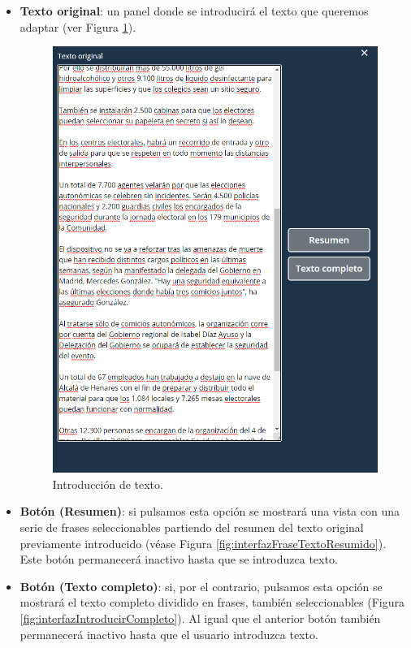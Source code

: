  \begin{itemize}
 	\item \textbf{Texto original}: un  panel donde se introducirá el texto que queremos adaptar (ver Figura \ref{fig:interfazIntroduccionTexto}).
 	\begin{figure}[h!]
 		\centering
 		
 		
 		\includegraphics[scale=0.6]{Imagenes/Figuras/PanelIzquierdo}
 		
 		
 		\caption{Introducción de texto.}
 		\label{fig:interfazIntroduccionTexto}
 	\end{figure}
 	 	\item \textbf{Botón (Resumen)}: si pulsamos esta opción se mostrará una vista con una serie de frases seleccionables partiendo del resumen del texto original previamente introducido (véase Figura \ref{fig:interfazFraseTextoResumido}). Este botón permanecerá inactivo hasta que se introduzca texto. 
 	 	 	\item \textbf{Botón (Texto completo)}: si, por el contrario, pulsamos esta opción se mostrará el texto completo dividido en frases, también seleccionables (Figura \ref{fig:interfazIntroducirCompleto}). Al igual que el anterior botón también permanecerá inactivo hasta que el usuario introduzca texto. 
 	 	 \begin{figure}[h!]
 	 	 	\centering
 	 	 	

\end{figure}
\end{itemize}
